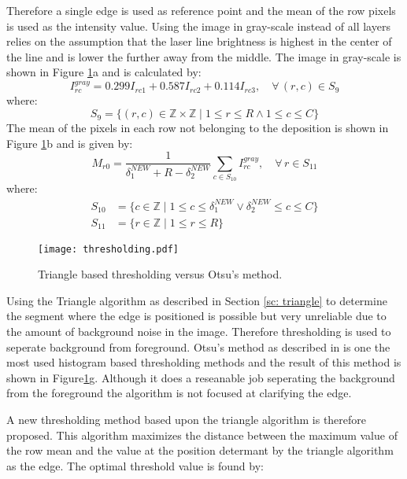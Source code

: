 Therefore a single edge is used as reference point and the mean of the row pixels is used as the intensity value. Using the image in gray-scale instead of all layers relies on the assumption that the laser line brightness is highest in the center of the line and is lower the further away from the middle. The image in gray-scale is shown in Figure \ref{fig: thresholding}a and is calculated by:
\begin{equation}
I^{gray}_{rc} = 0.299 I_{rc1} + 0.587 I_{rc2} + 0.114 I_{rc3}, \quad \forall \, (r,c) \in S_9
\end{equation}
where:
\begin{equation}
S_9 = \{(r,c)\in \mathbb {Z} \times \mathbb {Z} \mid 1 \leq r \leq R \land 1 \leq c \leq C \} 
\end{equation}
The mean of the pixels in each row not belonging to the deposition is shown in Figure \ref{fig: thresholding}b and is given by:
\begin{equation}
M_{r0} =  \frac{1}{\delta^{NEW}_1 + R - \delta^{NEW}_2}  \sum_{c \in S_{10}}  I^{gray}_{rc}, \quad \forall \, r \in S_{11}
\end{equation}
where:
\begin{align}
S_{10} &= \{c \in \mathbb {Z} \mid 1 \leq c \leq \delta^{NEW}_1 \lor \delta^{NEW}_2 \leq c \leq C \} \\
S_{11} &= \{r \in \mathbb {Z} \mid 1 \leq r \leq R \}
\end{align}
\begin{figure}[!ht]
\centering
\texttt{[image: thresholding.pdf]} 
\caption{Triangle based thresholding versus Otsu's method.}
\label{fig: thresholding}
\end{figure}
Using the Triangle algorithm as described in Section \ref{sc: triangle} to determine the segment where the edge is positioned is possible but very unreliable due to the amount of background noise in the image. Therefore thresholding is used to seperate background from foreground. Otsu's method as described in \cite{otsu1979threshold} is one the most used histogram based thresholding methods and the result of this method is shown in Figure\ref{fig: thresholding}g. Although it does a reseanable job seperating the background from the foreground the algorithm is not focused at clarifying the edge. 

A new thresholding method based upon the triangle algorithm is therefore proposed. This algorithm maximizes the distance between the maximum value of the row mean and the value at the position determant by the triangle algorithm as the edge. The optimal threshold value is found by:

